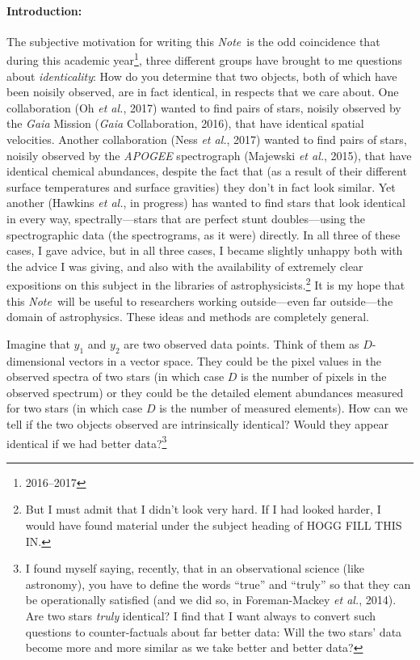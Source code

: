 \documentclass[12pt,letterpaper]{article}
\newcommand{\foreign}[1]{\textsl{#1}}
\newcommand{\project}[1]{\textsl{#1}}
\newcommand{\acronym}[1]{{\small{#1}}}
\newcommand{\documentname}{\textsl{Note}}
\newcommand{\etal}{\foreign{et al.}}
\begin{document}
\paragraph{Introduction:}
The subjective motivation for writing this \documentname\ is the odd coincidence
that during this academic year\footnote{2016--2017}, three different groups
have brought to me questions about \emph{identicality}: How do you
determine that two objects, both of which have been noisily observed,
are in fact identical, in respects that we care about. One collaboration
(Oh \etal, 2017)
wanted to find pairs of stars, noisily observed by
the \project{Gaia} Mission (\project{Gaia} Collaboration, 2016), that have identical spatial
velocities.
Another collaboration (Ness \etal, 2017) wanted to find pairs
of stars, noisily observed by the \project{\acronym{APOGEE}}
spectrograph (Majewski \etal, 2015), that have identical chemical abundances, despite the fact
that (as a result of their different surface temperatures and surface
gravities) they don't in fact look similar.
Yet another (Hawkins \etal, in progress) has wanted to find stars that
look identical in every way, spectrally---stars that are perfect stunt
doubles---using the spectrographic data (the spectrograms, as it were)
directly. In all three of these cases, I gave advice, but in all three
cases, I became slightly unhappy both with the advice I was giving, and
also with the availability of extremely clear expositions on this subject
in the libraries of astrophysicists.\footnote{But I must admit that I didn't
  look very hard. If I had looked harder, I would have found material under
  the subject heading of HOGG FILL THIS IN.}
It is my hope that this \documentname\ will be useful to researchers working
outside---even far outside---the domain of astrophysics. These ideas and methods 
are completely general.

Imagine that $y_1$ and $y_2$ are two observed data points. Think of
them as $D$-dimensional vectors in a vector space. They could be the
pixel values in the observed spectra of two stars (in which case $D$
is the number of pixels in the observed spectrum) or they could be
the detailed element abundances measured for two stars (in which case
$D$ is the number of measured elements). How can we tell if the two
objects observed are intrinsically identical? Would they appear
identical if we had better data?\footnote{I found myself saying,
  recently, that in an observational science (like astronomy), you
  have to define the words ``true'' and ``truly'' so that they can be
  operationally satisfied (and we did so, in Foreman-Mackey \etal, 2014).
  Are two stars \emph{truly} identical?  I
  find that I want always to convert such questions to
  counter-factuals about far better data: Will the two stars' data
  become more and more similar as we take better and better data?}
\end{document}
